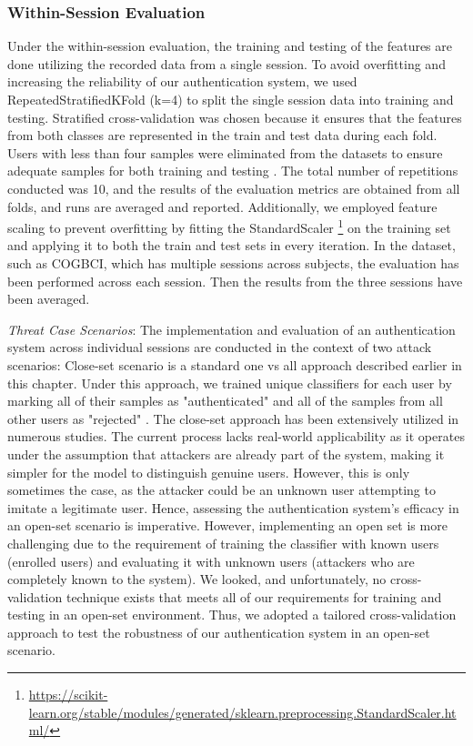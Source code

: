 \subsubsection{Within-Session Evaluation}
Under the within-session evaluation, the training and testing of the features are done utilizing the recorded data from a single session. To avoid overfitting and increasing the reliability of our authentication system, we used RepeatedStratifiedKFold (k=4) to split the single session data into training and testing. Stratified cross-validation was chosen because it ensures that the features from both classes are represented in the train and test data during each fold. Users with less than four samples were eliminated from the datasets to ensure adequate samples for both training and testing \cite{arias2023performance}. The total number of repetitions conducted was 10, and the results of the evaluation metrics are obtained from all folds, and runs are averaged and reported.
Additionally, we employed feature scaling to prevent overfitting by fitting the StandardScaler \footnote{\url{https://scikit-learn.org/stable/modules/generated/sklearn.preprocessing.StandardScaler.html/}} on the training set and applying it to both the train and test sets in every iteration. In the dataset, such as COGBCI, which has multiple sessions across subjects, the evaluation has been performed across each session. Then the results from the three sessions have been averaged. 
\smallskip

\textit{Threat Case Scenarios}: The implementation and evaluation of an authentication system across individual sessions are conducted in the context of two attack scenarios: Close-set scenario is a standard one vs all approach described earlier in this chapter. Under this approach,  
we trained unique classifiers for each user by marking all of their samples as "authenticated" and all of the samples from all other users as "rejected" \cite{arias2023performance}. The close-set approach has been extensively utilized in numerous studies. The current process lacks real-world applicability as it operates under the assumption that attackers are already part of the system, making it simpler for the model to distinguish genuine users. However, this is only sometimes the case, as the attacker could be an unknown user attempting to imitate a legitimate user. Hence, assessing the authentication system's efficacy in an open-set scenario is imperative. However, implementing an open set is more challenging due to the requirement of training the classifier with known users (enrolled users) and evaluating it with unknown users (attackers who are completely known to the system). We looked, and unfortunately, no cross-validation technique exists that meets all of our requirements for training and testing in an open-set environment. Thus, we adopted a tailored cross-validation approach to test the robustness of our authentication system in an open-set scenario. 

